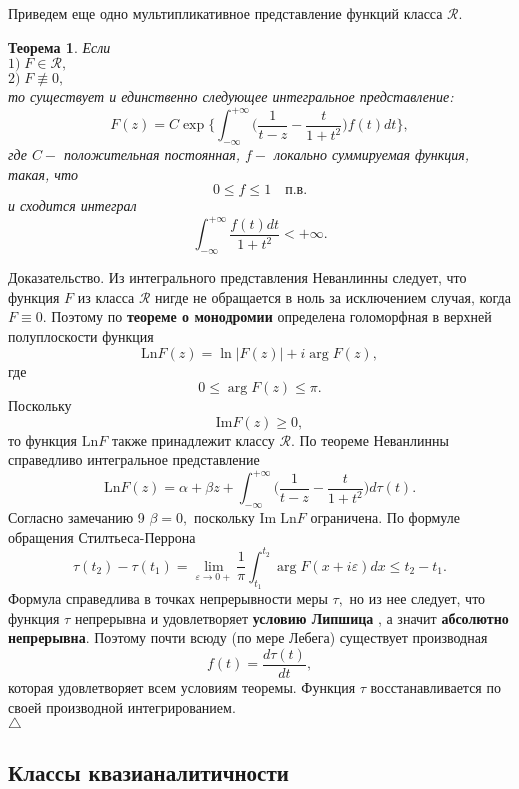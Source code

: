 \documentclass[12 pt, a4 paper]{article}
\theoremstyle{plain}   \newtheorem{Pro}{Задача}
\newtheorem{The}{Теорема}
\begin{document}
Приведем еще одно мультипликативное представление функций класса
$ \mathcal{R} . $
\begin{The}
Если\\
$ 1) \; F \in \mathcal{R} , $ \\
$ 2) \; F \not \equiv 0 , $ \\
то существует и единственно следующее интегральное представление:
$$
  F(z)=C \exp \Biggl \{ \int _{-\infty}^{+\infty}
  \biggl ( \frac{1}{t-z}-\frac{t}{1+t^2} \biggr )
  f(t)dt \Biggr \} ,
$$
где
$ C - $
положительная постоянная,
$ f - $
локально суммируемая функция, такая, что
$$
  0 \leq f \leq 1 \quad п.в.
$$
и сходится интеграл
$$
  \int _{-\infty}^{+\infty}
  \frac{f(t)dt}{1+t^2} < +\infty .
$$
\end{The}
{\Large Доказательство.}
Из интегрального представления Неванлинны следует, что функция
$ F $
из класса
$ \mathcal{R} $
нигде не обращается в ноль за исключением случая, когда
$ F \equiv 0. $
Поэтому по
{\bfseries теореме о монодромии}
определена голоморфная в верхней полуплоскости функция
$$
  \mathrm{Ln} F(z)= \ln |F(z)|+i \arg F(z),
$$
где
$$
  0 \leq \arg F(z) \leq \pi .
$$
Поскольку
$$
  \mathrm{Im} F(z) \geq 0,
$$
то функция
$ \mathrm{Ln} F $
также принадлежит классу
$ \mathcal{R} . $
По теореме Неванлинны справедливо интегральное представление
$$
  \mathrm{Ln} F(z)= \alpha +\beta z + \int _{-\infty}^{+\infty}
  \biggl ( \frac{1}{t-z}-\frac{t}{1+t^2} \biggr )
  d\tau (t) .
$$
Согласно замечанию 9
$ \beta =0, $
поскольку
$ \mathrm{Im \; Ln} F $
ограничена.
По формуле обращения Стилтьеса-Перрона             						      							
$$
  \tau (t_2 )-\tau (t_1 )=\lim _{\varepsilon \rightarrow 0+}
  \frac{1}{\pi} \int _{t_1}^{t_2}
  \arg F(x+i \varepsilon )dx \leq t_2 -t_1 .
$$
Формула справедлива в точках непрерывности меры
$ \tau , $
но из нее следует, что функция
$ \tau $
непрерывна и удовлетворяет
{\bfseries условию Липшица}
, а значит
{\bfseries абсолютно непрерывна}.
Поэтому почти всюду (по мере Лебега) существует производная
$$
  f(t)=\frac{d\tau (t)}{dt},
$$
которая удовлетворяет всем условиям теоремы. Функция
$ \tau $
восстанавливается по своей производной интегрированием.
\\
$ \triangle $
\newpage
\subsection{Классы квазианалитичности}
$ \; $
\\
\end{document}
